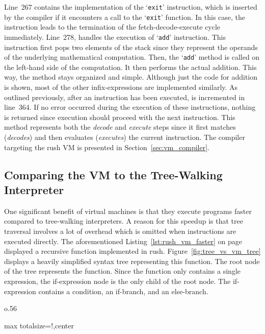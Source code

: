 Line~267 contains the implementation of the `\texttt{exit}' instruction, which is inserted by the compiler if it encounters a call to the `\texttt{exit}' function.
In this case, the instruction leads to the termination of the fetch-decode-execute cycle immediately.
Line~278, handles the execution of `\texttt{add}' instruction.
This instruction first pops two elements of the stack since they represent the operands of the underlying mathematical computation.
Then, the `\texttt{add}' method is called on the left-hand side of the computation.
It then performs the actual addition.
This way, the  method stays organized and simple.
Although just the code for addition is shown, most of the other infix-expressions are implemented similarly.
As outlined previously, after an instruction has been executed,  is incremented in line~364.
If no error occurred during the execution of these instructions, nothing is returned since execution should proceed with the next instruction.
This method represents both the \emph{decode} and \emph{execute} steps since it first matches (\emph{decodes}) and then evaluates (\emph{executes}) the current instruction.
The compiler targeting the rush VM is presented in Section~\ref{sec:vm_compiler}.

\subsection{Comparing the VM to the Tree-Walking Interpreter}

One significant benefit of virtual machines is that they execute programs faster compared to tree-walking interpreters.
A reason for this speedup is that tree traversal involves a lot of overhead which is omitted when instructions are executed directly.
The aforementioned Listing~\ref{lst:rush_vm_faster} on page~\pageref{lst:rush_vm_faster} displayed a recursive function implemented in rush.
Figure~\ref{fig:tree_vs_vm_tree} displays a heavily simplified syntax tree representing this function.
The root node of the tree represents the  function.
Since the function only contains a single expression, the if-expression node is the only child of the root node.
The if-expression contains a condition, an if-branch, and an else-branch.

\begin{wrapfigure}{o}{.56\textwidth}
	\begin{adjustbox}{max totalsize={\textwidth}{!},center}
	\end{adjustbox}
    \caption{AST and VM instructions of the recursive rush program in Listing~\ref{lst:rush_vm_faster}.}\label{fig:tree_vs_vm_tree}
\end{wrapfigure}

